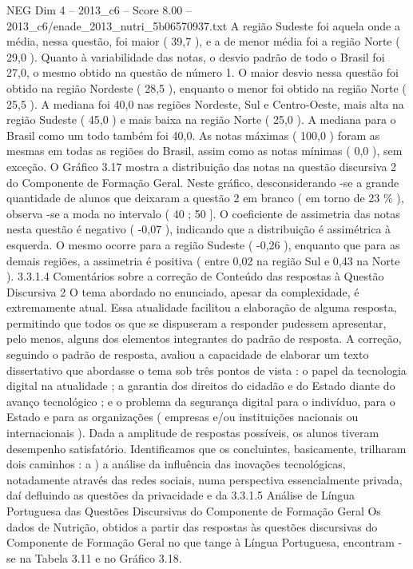 \begin{textsample}{NEG Dim 4 – 2013\_c6 – Score 8.00 – 2013\_c6/enade\_2013\_nutri\_5b06570937.txt}
A região Sudeste foi aquela onde a média, nessa questão, foi maior ( 39,7 ), e a de menor média foi a região Norte ( 29,0 ).
Quanto à variabilidade das notas, o desvio padrão de todo o Brasil foi 27,0, o mesmo obtido na questão de número 1.
O maior desvio nessa questão foi obtido na região Nordeste ( 28,5 ), enquanto o menor foi obtido na região Norte ( 25,5 ).
A mediana foi 40,0 nas regiões Nordeste, Sul e Centro-Oeste, mais alta na região Sudeste ( 45,0 ) e mais baixa na região Norte ( 25,0 ).
A mediana para o Brasil como um todo também foi 40,0.
As notas máximas ( 100,0 ) foram as mesmas em todas as regiões do Brasil, assim como as notas mínimas ( 0,0 ), sem exceção.
O Gráfico 3.17 mostra a distribuição das notas na questão discursiva 2 do Componente de Formação Geral.
Neste gráfico, desconsiderando -se a grande quantidade de alunos que deixaram a questão 2 em branco ( em torno de 23 \% ), observa -se a moda no intervalo ( 40 ; 50 ].
O coeficiente de assimetria das notas nesta questão é negativo ( -0,07 ), indicando que a distribuição é assimétrica à esquerda.
O mesmo ocorre para a região Sudeste ( -0,26 ), enquanto que para as demais regiões, a assimetria é positiva ( entre 0,02 na região Sul e 0,43 na Norte ). 3.3.1.4 Comentários sobre a correção de Conteúdo das respostas à Questão Discursiva 2 O tema abordado no enunciado, apesar da complexidade, é extremamente atual.
Essa atualidade facilitou a elaboração de alguma resposta, permitindo que todos os que se dispuseram a responder pudessem apresentar, pelo menos, alguns dos elementos integrantes do padrão de resposta.
A correção, seguindo o padrão de resposta, avaliou a capacidade de elaborar um texto dissertativo que abordasse o tema sob três pontos de vista : o papel da tecnologia digital na atualidade ; a garantia dos direitos do cidadão e do Estado diante do avanço tecnológico ; e o problema da segurança digital para o indivíduo, para o Estado e para as organizações ( empresas e/ou instituições nacionais ou internacionais ).
Dada a amplitude de respostas possíveis, os alunos tiveram desempenho satisfatório.
Identificamos que os concluintes, basicamente, trilharam dois caminhos : a ) a análise da influência das inovações tecnológicas, notadamente através das redes sociais, numa perspectiva essencialmente privada, daí defluindo as questões da privacidade e da 3.3.1.5 Análise de Língua Portuguesa das Questões Discursivas do Componente de Formação Geral Os dados de Nutrição, obtidos a partir das respostas às questões discursivas do Componente de Formação Geral no que tange à Língua Portuguesa, encontram -se na Tabela 3.11 e no Gráfico 3.18.

\end{textsample}
